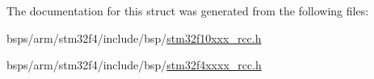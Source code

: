 The documentation for this struct was generated from the following files\+:\begin{DoxyCompactItemize}
\item 
bsps/arm/stm32f4/include/bsp/\mbox{\hyperlink{stm32f10xxx__rcc_8h}{stm32f10xxx\+\_\+rcc.\+h}}\item 
bsps/arm/stm32f4/include/bsp/\mbox{\hyperlink{stm32f4xxxx__rcc_8h}{stm32f4xxxx\+\_\+rcc.\+h}}\end{DoxyCompactItemize}
